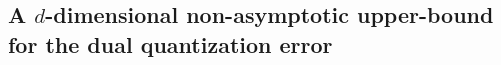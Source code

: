  
 
 
 
 
 
 \subsection{A $d$-dimensional non-asymptotic upper-bound for the dual
 quantization error}\label{sec:ddimBound}
 
% 
% 
% 
% 
